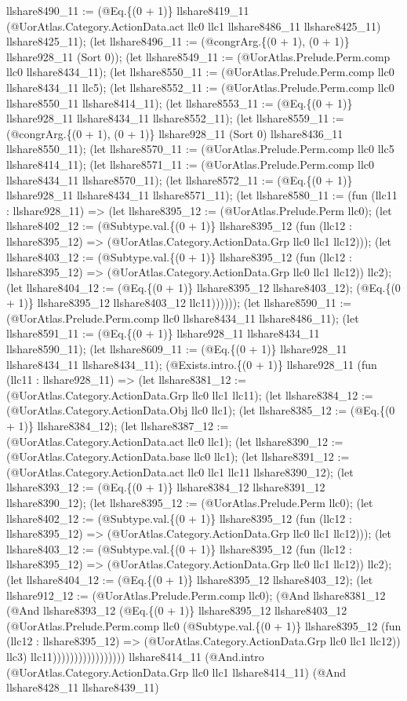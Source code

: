 \documentclass[11pt]{article}
\begin{document}
llshare8490\_11 := (@Eq.\{(0 + 1)\} llshare8419\_11 (@UorAtlas.Category.ActionData.act llc0 llc1 llshare8486\_11 llshare8425\_11) llshare8425\_11); (let llshare8496\_11 := (@congrArg.\{(0 + 1), (0 + 1)\} llshare928\_11 (Sort 0)); (let llshare8549\_11 := (@UorAtlas.Prelude.Perm.comp llc0 llshare8434\_11); (let llshare8550\_11 := (@UorAtlas.Prelude.Perm.comp llc0 llshare8434\_11 llc5); (let llshare8552\_11 := (@UorAtlas.Prelude.Perm.comp llc0 llshare8550\_11 llshare8414\_11); (let llshare8553\_11 := (@Eq.\{(0 + 1)\} llshare928\_11 llshare8434\_11 llshare8552\_11); (let llshare8559\_11 := (@congrArg.\{(0 + 1), (0 + 1)\} llshare928\_11 (Sort 0) llshare8436\_11 llshare8550\_11); (let llshare8570\_11 := (@UorAtlas.Prelude.Perm.comp llc0 llc5 llshare8414\_11); (let llshare8571\_11 := (@UorAtlas.Prelude.Perm.comp llc0 llshare8434\_11 llshare8570\_11); (let llshare8572\_11 := (@Eq.\{(0 + 1)\} llshare928\_11 llshare8434\_11 llshare8571\_11); (let llshare8580\_11 := (fun (llc11 : llshare928\_11) => (let llshare8395\_12 := (@UorAtlas.Prelude.Perm llc0); (let llshare8402\_12 := (@Subtype.val.\{(0 + 1)\} llshare8395\_12 (fun (llc12 : llshare8395\_12) => (@UorAtlas.Category.ActionData.Grp llc0 llc1 llc12))); (let llshare8403\_12 := (@Subtype.val.\{(0 + 1)\} llshare8395\_12 (fun (llc12 : llshare8395\_12) => (@UorAtlas.Category.ActionData.Grp llc0 llc1 llc12)) llc2); (let llshare8404\_12 := (@Eq.\{(0 + 1)\} llshare8395\_12 llshare8403\_12); (@Eq.\{(0 + 1)\} llshare8395\_12 llshare8403\_12 llc11)))))); (let llshare8590\_11 := (@UorAtlas.Prelude.Perm.comp llc0 llshare8434\_11 llshare8486\_11); (let llshare8591\_11 := (@Eq.\{(0 + 1)\} llshare928\_11 llshare8434\_11 llshare8590\_11); (let llshare8609\_11 := (@Eq.\{(0 + 1)\} llshare928\_11 llshare8434\_11 llshare8434\_11); (@Exists.intro.\{(0 + 1)\} llshare928\_11 (fun (llc11 : llshare928\_11) => (let llshare8381\_12 := (@UorAtlas.Category.ActionData.Grp llc0 llc1 llc11); (let llshare8384\_12 := (@UorAtlas.Category.ActionData.Obj llc0 llc1); (let llshare8385\_12 := (@Eq.\{(0 + 1)\} llshare8384\_12); (let llshare8387\_12 := (@UorAtlas.Category.ActionData.act llc0 llc1); (let llshare8390\_12 := (@UorAtlas.Category.ActionData.base llc0 llc1); (let llshare8391\_12 := (@UorAtlas.Category.ActionData.act llc0 llc1 llc11 llshare8390\_12); (let llshare8393\_12 := (@Eq.\{(0 + 1)\} llshare8384\_12 llshare8391\_12 llshare8390\_12); (let llshare8395\_12 := (@UorAtlas.Prelude.Perm llc0); (let llshare8402\_12 := (@Subtype.val.\{(0 + 1)\} llshare8395\_12 (fun (llc12 : llshare8395\_12) => (@UorAtlas.Category.ActionData.Grp llc0 llc1 llc12))); (let llshare8403\_12 := (@Subtype.val.\{(0 + 1)\} llshare8395\_12 (fun (llc12 : llshare8395\_12) => (@UorAtlas.Category.ActionData.Grp llc0 llc1 llc12)) llc2); (let llshare8404\_12 := (@Eq.\{(0 + 1)\} llshare8395\_12 llshare8403\_12); (let llshare912\_12 := (@UorAtlas.Prelude.Perm.comp llc0); (@And llshare8381\_12 (@And llshare8393\_12 (@Eq.\{(0 + 1)\} llshare8395\_12 llshare8403\_12 (@UorAtlas.Prelude.Perm.comp llc0 (@Subtype.val.\{(0 + 1)\} llshare8395\_12 (fun (llc12 : llshare8395\_12) => (@UorAtlas.Category.ActionData.Grp llc0 llc1 llc12)) llc3) llc11))))))))))))))))) llshare8414\_11 (@And.intro (@UorAtlas.Category.ActionData.Grp llc0 llc1 llshare8414\_11) (@And llshare8428\_11 llshare8439\_11) 
\end{document}
